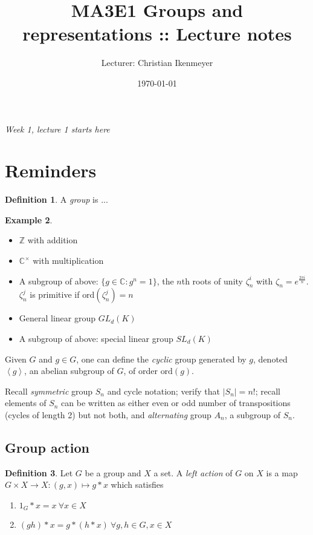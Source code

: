 \documentclass[a4paper]{article}
\title{MA3E1 Groups and representations :: Lecture notes}
\author{Lecturer: Christian Ikenmeyer}
\date{\today}
\newcommand{\la}{\left\langle}
\newcommand{\ra}{\right\rangle}
\newcommand{\Z}{\mathbb{Z}}
\newcommand{\C}{\mathbb{C}}
\newcommand{\ord}{\text{ord}}
\theoremstyle{definition}
\newtheorem{defn}{Definition}[subsection]
\newtheorem{example}[defn]{Example}
\begin{document}
\maketitle
\thispagestyle{empty}

\tableofcontents
\thispagestyle{empty}
\newpage
\setcounter{page}{1}

\begin{flushright}
\textit{Week 1, lecture 1 starts here}
\end{flushright}

\section{Reminders}
\begin{defn}
A \textit{group} is ...
\end{defn}

\begin{example}
\begin{itemize}
\item $\Z$ with addition
\item $\C^\times$ with multiplication
\item A subgroup of above: $\{g\in\C:g^n=1\}$, the $n$th roots of unity $\zeta_n^i$ with $\zeta_n=e^{\frac{2\pi i}{n}}$. $\zeta_n^j$ is primitive if $\ord(\zeta_n^j)=n$
\item General linear group $GL_d(K)$
\item A subgroup of above: special linear group $SL_d(K)$
\end{itemize}
\end{example}

Given $G$ and $g\in G$, one can define the \textit{cyclic} group generated by $g$, denoted $\la g\ra$, an abelian subgroup of $G$, of order $\ord(g)$.

Recall \textit{symmetric} group $S_n$ and cycle notation; verify that $|S_n|=n!$; recall elements of $S_n$ can be written as either even or odd number of transpositions (cycles of length 2) but not both, and \textit{alternating} group $A_n$, a subgroup of $S_n$.

\subsection{Group action}

\begin{defn}
Let $G$ be a group and $X$ a set. A \textit{left action} of $G$ on $X$ is a map $G\times X\rightarrow X:(g,x)\mapsto g\ast x$ which satisfies
\begin{enumerate}
\item $1_G\ast x=x \ \forall x\in X$
\item $(gh)\ast x=g\ast(h\ast x) \ \forall g,h\in G,x\in X$
\end{enumerate}
\end{defn}
\end{document}
